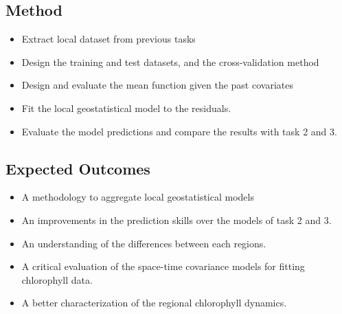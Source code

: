 \subsection{Method}

\begin{itemize}
\item Extract local dataset from previous tasks
\item Design the training and test datasets, and the cross-validation method
\item Design and evaluate the mean function given the past covariates
\item Fit the local geostatistical model to the residuals.
\item Evaluate the model predictions and compare the results with task 2 and 3.
\end{itemize}

\subsection{Expected Outcomes}

\begin{itemize}
\item A methodology to aggregate local geostatistical models
\item An improvements in the prediction skills over the models of task 2 and 3.
\item An understanding of the differences between each regions.
\item A critical evaluation of the space-time covariance models for fitting chlorophyll data.
\item A better characterization of the regional chlorophyll dynamics.
\end{itemize}
